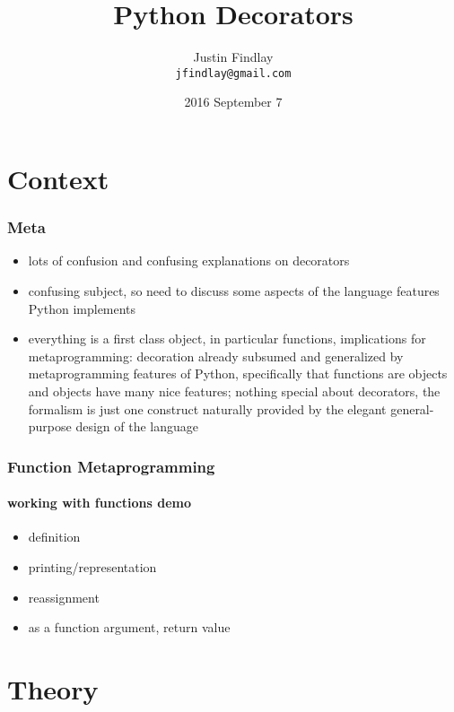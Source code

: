 \documentclass{beamer}
\title{Python Decorators}
\author{Justin Findlay\\\texttt{jfindlay@gmail.com}}
\date[SLC Python]{2016 September 7}
\begin{document}
\maketitle

\section{Context}

\begin{frame}
\frametitle{Meta}
\begin{itemize}
  \item{lots of confusion and confusing explanations on decorators}
  \item{confusing subject, so need to discuss some aspects of the language features Python implements}
  \item{everything is a first class object, in particular functions, implications for metaprogramming: decoration already subsumed and generalized by metaprogramming features of Python, specifically that functions are objects and objects have many nice features; nothing special about decorators, the formalism is just one construct naturally provided by the elegant general-purpose design of the language}
\end{itemize}
\end{frame}

\begin{frame}
\frametitle{Function Metaprogramming}
\framesubtitle{working with functions demo}
\begin{itemize}
  \item{definition}
  \item{printing/representation}
  \item{reassignment}
  \item{as a function argument, return value}
\end{itemize}
\end{frame}

\section{Theory}
\end{document}
